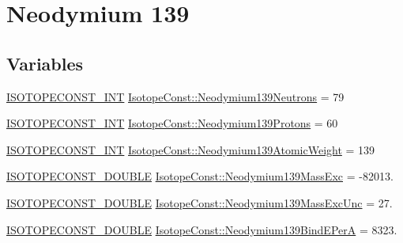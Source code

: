 \hypertarget{group___isotope_const-_neodymium-_nd139}{}\section{Neodymium 139}
\label{group___isotope_const-_neodymium-_nd139}
\subsection*{Variables}
\begin{DoxyCompactItemize}
\item 
\mbox{\hyperlink{group___isotope_const-_macros_ga5f18360b3e99483a35c32d789e62621c}{I\+S\+O\+T\+O\+P\+E\+C\+O\+N\+S\+T\+\_\+\+I\+NT}} \mbox{\hyperlink{group___isotope_const-_neodymium-_nd139_gafee0324e5ed61cc13980bccd3138e74f}{Isotope\+Const\+::\+Neodymium139\+Neutrons}} = 79
\item 
\mbox{\hyperlink{group___isotope_const-_macros_ga5f18360b3e99483a35c32d789e62621c}{I\+S\+O\+T\+O\+P\+E\+C\+O\+N\+S\+T\+\_\+\+I\+NT}} \mbox{\hyperlink{group___isotope_const-_neodymium-_nd139_ga1083365ac3fdef10cad8248749bcb50b}{Isotope\+Const\+::\+Neodymium139\+Protons}} = 60
\item 
\mbox{\hyperlink{group___isotope_const-_macros_ga5f18360b3e99483a35c32d789e62621c}{I\+S\+O\+T\+O\+P\+E\+C\+O\+N\+S\+T\+\_\+\+I\+NT}} \mbox{\hyperlink{group___isotope_const-_neodymium-_nd139_gac92f028cc4e5c85ce6e1377749f67fb9}{Isotope\+Const\+::\+Neodymium139\+Atomic\+Weight}} = 139
\item 
\mbox{\hyperlink{group___isotope_const-_macros_ga8f45a7272ce02c0b4c65c44636ed719a}{I\+S\+O\+T\+O\+P\+E\+C\+O\+N\+S\+T\+\_\+\+D\+O\+U\+B\+LE}} \mbox{\hyperlink{group___isotope_const-_neodymium-_nd139_gac33d0d9065e27fe2f9649759d564e57c}{Isotope\+Const\+::\+Neodymium139\+Mass\+Exc}} = -\/82013.
\item 
\mbox{\hyperlink{group___isotope_const-_macros_ga8f45a7272ce02c0b4c65c44636ed719a}{I\+S\+O\+T\+O\+P\+E\+C\+O\+N\+S\+T\+\_\+\+D\+O\+U\+B\+LE}} \mbox{\hyperlink{group___isotope_const-_neodymium-_nd139_ga522eef4a395741948985f707f1c43ab9}{Isotope\+Const\+::\+Neodymium139\+Mass\+Exc\+Unc}} = 27.
\item 
\mbox{\hyperlink{group___isotope_const-_macros_ga8f45a7272ce02c0b4c65c44636ed719a}{I\+S\+O\+T\+O\+P\+E\+C\+O\+N\+S\+T\+\_\+\+D\+O\+U\+B\+LE}} \mbox{\hyperlink{group___isotope_const-_neodymium-_nd139_gac78e9050601b328547aff154dc5d3a36}{Isotope\+Const\+::\+Neodymium139\+Bind\+E\+PerA}} = 8323.
\item 

\end{DoxyCompactItemize}
